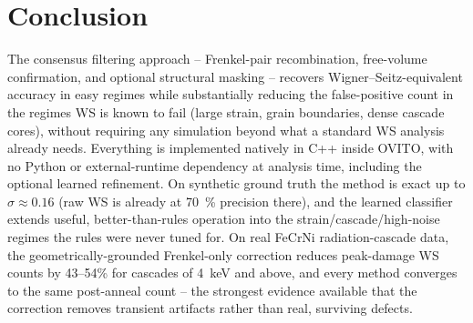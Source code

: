 \documentclass[11pt]{article}
\begin{document}
\section{Conclusion}

The consensus filtering approach -- Frenkel-pair recombination, free-volume confirmation, and
optional structural masking -- recovers Wigner--Seitz-equivalent accuracy in easy regimes while
substantially reducing the false-positive count in the regimes WS is known to fail (large strain,
grain boundaries, dense cascade cores), without requiring any simulation beyond what a standard WS
analysis already needs. Everything is implemented natively in C++ inside OVITO, with no Python or
external-runtime dependency at analysis time, including the optional learned refinement. On
synthetic ground truth the method is exact up to $\sigma \approx 0.16$ (raw WS is already at
\SI{70}{\percent} precision there), and the learned classifier extends useful, better-than-rules
operation into the strain/cascade/high-noise regimes the rules were never tuned for. On real
FeCrNi radiation-cascade data, the geometrically-grounded Frenkel-only correction reduces
peak-damage WS counts by 43--54\% for cascades of 4~keV and above, and every method converges to
the same post-anneal count -- the strongest evidence available that the correction removes
transient artifacts rather than real, surviving defects.
\end{document}
